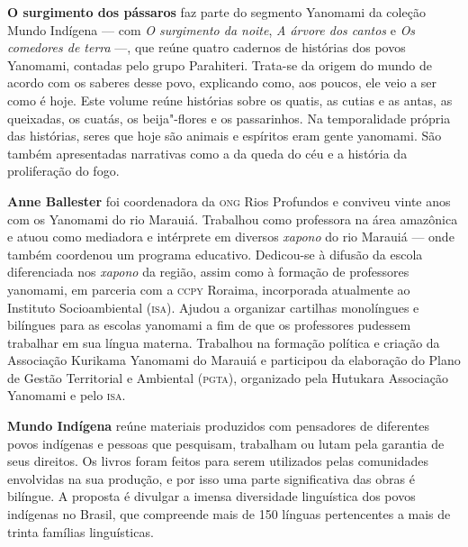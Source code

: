 \textbf{O surgimento dos pássaros} faz parte do segmento Yanomami da coleção Mundo Indígena --- com \textit{O surgimento da noite}, \textit{A árvore dos cantos} e \textit{Os comedores de terra} ---, que reúne quatro cadernos de histórias dos povos Yanomami, contadas pelo grupo Parahiteri. Trata-se da origem do mundo de acordo com os saberes desse povo, explicando como, aos poucos, ele veio a ser como é hoje. Este volume reúne histórias sobre os quatis, as cutias e as antas, as queixadas, os cuatás, os beija"-flores e os passarinhos. Na temporalidade própria das histórias, seres que hoje são animais e espíritos eram gente yanomami. São também apresentadas narrativas como a da queda do céu e a história da proliferação do fogo.

\textbf{Anne Ballester} foi coordenadora da \textsc{ong} Rios Profundos e conviveu vinte anos com os Yanomami do rio Marauiá. Trabalhou como professora na área amazônica e atuou como mediadora e intérprete em diversos \textit{xapono} do rio Marauiá --- onde também coordenou um programa educativo. Dedicou-se à difusão da escola diferenciada nos \textit{xapono} da região, assim como à formação de professores yanomami, em parceria com a \textsc{ccpy} Roraima, incorporada atualmente ao Instituto Socioambiental (\textsc{isa}). Ajudou a organizar cartilhas monolíngues e bilíngues para as escolas yanomami a fim de que os professores pudessem trabalhar em sua língua materna. Trabalhou na formação política e criação da Associação Kurikama Yanomami do Marauiá e participou da elaboração do Plano de Gestão Territorial e Ambiental (\textsc{pgta}), organizado pela Hutukara Associação Yanomami e pelo \textsc{isa}.

\textbf{Mundo Indígena} reúne materiais produzidos com pensadores de diferentes povos indígenas e pessoas que pesquisam, trabalham ou lutam pela garantia de seus direitos. Os livros foram feitos para serem utilizados pelas comunidades envolvidas na sua produção, e por isso uma parte significativa das obras é bilíngue. A proposta é divulgar a imensa diversidade linguística dos povos indígenas no Brasil, que compreende mais de 150 línguas pertencentes a mais de trinta famílias linguísticas.



